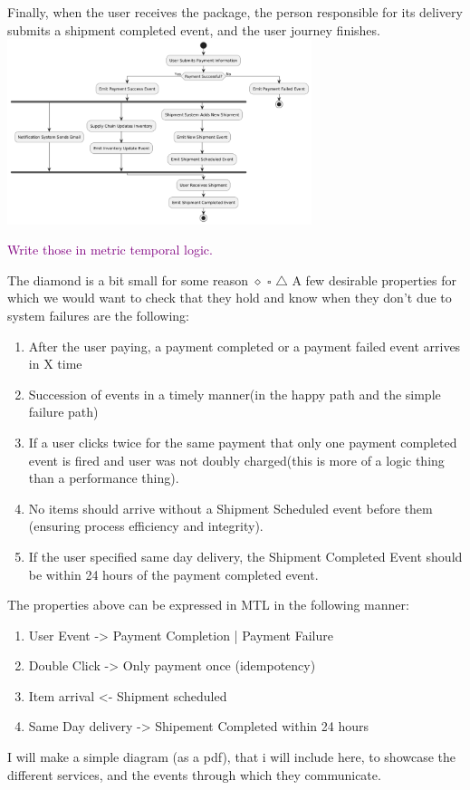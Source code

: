 \documentclass[twocolumn]{article}
\newcommand{\note}[1] {
	\textcolor{Purple}{#1}

}
\begin{document}
Finally, when the user receives the package, the person responsible for its delivery submits a shipment completed event,
and the user journey finishes.
\includegraphics[width=3.5in]{events-diagram.pdf}
\par \note{Write those in metric temporal logic.}

The diamond is a bit small for some reason
$\diamond$
$\square$
$\triangle$
A few desirable properties for which we would want to check that they hold and know when they don't due to
system failures are the following:
\begin{enumerate}
	\item After the user paying, a payment completed or a payment failed event arrives in X time
	\item Succession of events in a timely manner(in the happy path and the simple failure path)
	\item If a user clicks twice for the same payment that only one payment completed event is fired and user was not doubly charged(this is more of a logic thing than a performance thing).
	\item No items should arrive without a Shipment Scheduled event before them (ensuring process efficiency and integrity).
	\item If the user specified same day delivery, the Shipment Completed Event should be within 24 hours of the payment completed event.
\end{enumerate}
The properties above can be expressed in MTL in the following manner:
\begin{enumerate}
	\item User Event -> Payment Completion | Payment Failure
	\item Double Click -> Only payment once (idempotency)
	\item Item arrival <- Shipment scheduled
	\item Same Day delivery -> Shipement Completed within 24 hours
\end{enumerate}
I will make a simple diagram (as a pdf), that i will include here, to showcase the different services, and the events through which they communicate.
\end{document}
